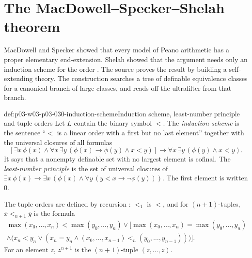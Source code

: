 \section{The MacDowell--Specker--Shelah theorem}
\label{sec:p03-w03-p03-030-mss}

MacDowell and Specker showed that every model of Peano arithmetic has a
proper elementary end-extension.  Shelah showed that the argument needs only
an induction scheme for the order
\cite[p.~206]{Schmerl1985TransferTheorems}.  The source proves the result by
building a self-extending theory.  The construction searches a tree of
definable equivalence classes for a canonical branch of large classes, and
reads off the ultrafilter from that branch.

\begin{hbdefinition}{def:p03-w03-p03-030-induction-scheme}{Induction scheme, least-number principle and tuple orders}
Let \(L\) contain the binary symbol \(<\).  The \emph{induction scheme}
\cite[p.~206]{Schmerl1985TransferTheorems} is the sentence ``\(<\) is a
linear order with a first but no last element'' together with the universal
closures of all formulas
\[
 [\exists x\,\phi(x)\wedge\forall x\,\exists y\,(\phi(x)\rightarrow
   \phi(y)\wedge x<y)]\rightarrow\forall x\,\exists y\,(\phi(y)\wedge x<y).
\]
It says that a nonempty definable set with no largest element is cofinal.
The \emph{least-number principle} is the set of universal closures of
\(\exists x\,\phi(x)\rightarrow\exists x\,(\phi(x)\wedge\forall
y\,(y<x\rightarrow\neg\phi(y)))\).  The first element is written \(0\).

The tuple orders are defined by recursion
\cite[p.~207]{Schmerl1985TransferTheorems}: \(<_1\) is \(<\), and for
\((n+1)\)-tuples, \(\bar x<_{n+1}\bar y\) is the formula
\begin{multline*}
 \max(x_0,\ldots,x_n)<\max(y_0,\ldots,y_n)\vee
 \bigl[\max(x_0,\ldots,x_n)=\max(y_0,\ldots,y_n)\\
 \wedge\bigl(x_n<y_n\vee(x_n=y_n\wedge(x_0,\ldots,x_{n-1})<_n
 (y_0,\ldots,y_{n-1}))\bigr)\bigr].
\end{multline*}
For an element \(z\), \(z^{n+1}\) is the \((n+1)\)-tuple \((z,\ldots,z)\).
\end{hbdefinition}

